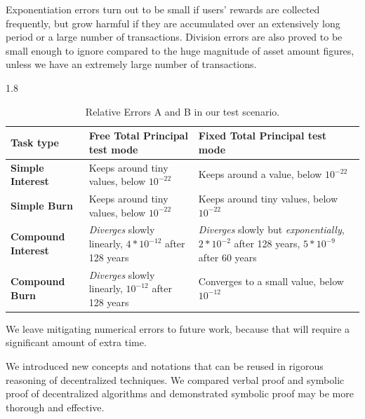 \documentclass{article}
\begin{document}
Exponentiation errors turn out to be small if users' rewards are collected frequently, 
but grow harmful if they are accumulated over 
an extensively long period or a large number of transactions.
Division errors are also proved 
to be small enough to ignore compared to the huge magnitude of asset amount figures, 
unless we have an extremely large number of transactions.

\begin{table}[H]
    \begin{spacing}{1.8}\centering
      \fontsize{8pt}{8pt}\selectfont
      \begin{tabular} {|m{2.4cm}|m{5.6cm}|m{6cm}|}
      \hline
      {\textbf{Task type}} & {\textbf{Free Total Principal test mode}} & {\textbf{Fixed Total Principal test mode}} \\
      \hline
      {\textbf{Simple Interest}} & {Keeps around tiny values, below $10^{-22}$} & {Keeps around a value, below $10^{-22}$} \\[3mm]
      \hline
      {\textbf{Simple Burn}} & {Keeps around tiny values, below $10^{-22}$} & {Keeps around tiny values, below $10^{-22}$} \\[3mm]
      \hline
      {\textbf{Compound Interest}} & {\textit{Diverges} slowly linearly, $4 * 10^{-12}$ after 128 years } & {\textit{Diverges} slowly but \textit{exponentially}, \newline $2 * 10^{-2}$ after 128 years, $5 * 10^{-9}$ after 60 years } \\[3mm]
      \hline
      {\textbf{Compound Burn}} & {\textit{Diverges} slowly linearly, $10^{-12}$ after 128 years} & {Converges to a small value, below $10^{-12}$} \\[3mm]
      \hline
    \end{tabular}
    \end{spacing}
  \caption {Relative Errors A and B in our test scenario.
  }
  \label{tbl:RelativeErrors}
  \end{table}

We leave mitigating numerical errors to future work, because that 
will require a significant amount of extra time.

We introduced new concepts and notations that can be reused in 
rigorous reasoning 
of decentralized techniques. We compared verbal proof and symbolic proof of 
decentralized algorithms and demonstrated symbolic proof may be more thorough and effective.
\end{document}
